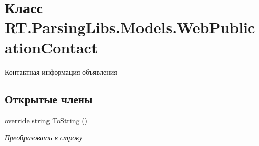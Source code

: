 \hypertarget{class_r_t_1_1_parsing_libs_1_1_models_1_1_web_publication_contact}{\section{Класс R\+T.\+Parsing\+Libs.\+Models.\+Web\+Publication\+Contact}
\label{class_r_t_1_1_parsing_libs_1_1_models_1_1_web_publication_contact}
}


Контактная информация объявления  


\subsection*{Открытые члены}
\begin{DoxyCompactItemize}
\item 
override string \hyperlink{class_r_t_1_1_parsing_libs_1_1_models_1_1_web_publication_contact_addf0ae50c66094a553b208839b991d5a}{To\+String} ()
\begin{DoxyCompactList}\small\item\em Преобразовать в строку \end{DoxyCompactList}\end{DoxyCompactItemize}
